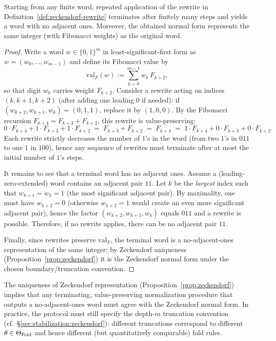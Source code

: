 \begin{proposition}\label{prop:zeckendorf-termination}
Starting from any finite word, repeated application of the rewrite in Definition~\ref{def:zeckendorf-rewrite} terminates after finitely many steps and yields a word with no adjacent ones. Moreover, the obtained normal form represents the same integer (with Fibonacci weights) as the original word.
\end{proposition}

\begin{proof}
Write a word $w\in\{0,1\}^m$ in least-significant-first form as $w=(w_0,\dots,w_{m-1})$ and define its Fibonacci value by
\[
\mathrm{val}_F(w):=\sum_{k=0}^{m-1} w_k\,F_{k+2},
\]
so that digit $w_k$ carries weight $F_{k+2}$.
Consider a rewrite acting on indices $(k,k+1,k+2)$ (after adding one leading $0$ if needed):
if $(w_{k+2},w_{k+1},w_k)=(0,1,1)$, replace it by $(1,0,0)$.
By the Fibonacci recursion $F_{k+4}=F_{k+3}+F_{k+2}$, this rewrite is value-preserving:
\[
0\cdot F_{k+4}+1\cdot F_{k+3}+1\cdot F_{k+2}
\;=\;
F_{k+3}+F_{k+2}
\;=\;
F_{k+4}
\;=\;
1\cdot F_{k+4}+0\cdot F_{k+3}+0\cdot F_{k+2}.
\]
Each rewrite strictly decreases the number of $1$'s in the word (from two $1$'s in $011$ to one $1$ in $100$), hence any sequence of rewrites must terminate after at most the initial number of $1$'s steps.

It remains to see that a terminal word has no adjacent ones.
Assume a (leading-zero-extended) word contains an adjacent pair $11$. Let $k$ be the \emph{largest} index such that $w_{k+1}=w_k=1$ (the most significant adjacent pair). By maximality, one must have $w_{k+2}=0$ (otherwise $w_{k+2}=1$ would create an even more significant adjacent pair), hence the factor $(w_{k+2},w_{k+1},w_k)$ equals $011$ and a rewrite is possible. Therefore, if no rewrite applies, there can be no adjacent pair $11$.

Finally, since rewrites preserve $\mathrm{val}_F$, the terminal word is a no-adjacent-ones representation of the same integer; by Zeckendorf uniqueness (Proposition~\ref{prop:zeckendorf}) it is the Zeckendorf normal form under the chosen boundary/truncation convention.
\end{proof}

\begin{remark}
The uniqueness of Zeckendorf representation (Proposition~\ref{prop:zeckendorf}) implies that any terminating, value-preserving normalization procedure that outputs a no-adjacent-ones word must agree with the Zeckendorf normal form. In practice, the protocol must still specify the depth-$m$ truncation convention (cf.\ \S\ref{sec:stabilization:zeckendorf}): different truncations correspond to different $\theta\in\Theta_{\mathrm{Fold}}$ and hence different (but quantitatively comparable) fold rules.
\end{remark}

